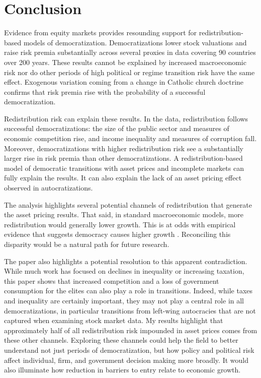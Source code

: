 \section{Conclusion}\label{section:conc}

Evidence from equity markets provides resounding support for redistribution-based models of democratization. Democratizations lower stock valuations and raise risk premia substantially across several proxies in data covering 90 countries over 200 years. These results cannot be explained by increased macroeconomic risk nor do other periods of high political or regime transition risk have the same effect. Exogenous variation coming from a change in Catholic church doctrine confirms that risk premia rise with the probability of a successful democratization. 

Redistribution risk can explain these results. In the data, redistribution follows successful democratizations: the size of the public sector and measures of economic competition rise, and income inequality and measures of corruption fall.  Moreover, democratizations with higher redistribution risk see a substantially larger rise in risk premia than other democratizations. A redistribution-based model of democratic transitions with asset prices and incomplete markets can fully explain the results. It can also explain the lack of an asset pricing effect observed in autocratizations.

\label{par:redistribution_highlight}
The analysis highlights several potential channels of redistribution that generate the asset pricing results. That said, in standard macroeconomic models, more redistribution would generally lower growth. This is at odds with empirical evidence that suggests democracy causes higher growth \citep{Acemoglu2019}. Reconciling this disparity would be a natural path for future research. 

The paper also highlights a potential resolution to this apparent contradiction. While much work has focused on declines in inequality or increasing taxation, this paper shows that increased competition and a loss of government consumption for the elites can also play a role in transitions. Indeed, while taxes and inequality are certainly important, they may not play a central role in all democratizations, in particular transitions from left-wing autocracies that are not captured when examining stock market data. My results highlight that approximately half of all redistribution risk impounded in asset prices comes from these other channels. Exploring these channels could help the field to better understand not just periods of democratization, but how policy and political risk affect individual, firm, and government decision making more broadly. It would also illuminate how reduction in barriers to entry relate to economic growth.

